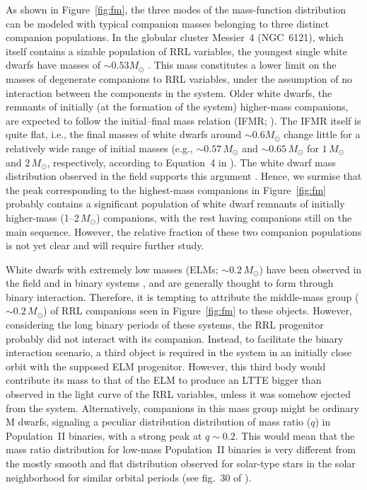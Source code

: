\documentclass[twocolumn,times]{aastex63}
\begin{document}
As shown in Figure~\ref{fig:fm}, the three modes of the mass-function distribution can be modeled with typical companion masses belonging
to three distinct companion populations.
In the globular cluster Messier~4 (NGC~6121), which itself contains a sizable population of RRL variables, the youngest single white dwarfs have masses of
$\sim0.53M_\odot$ \citep{2009ApJ...705..408K}. This mass constitutes a lower limit on the masses of degenerate companions to RRL variables,
under the assumption of no interaction between the components in the system. Older white dwarfs, the remnants of initially
(at the formation of the system) higher-mass companions, are expected to follow the initial--final mass relation (IFMR; \citealt{2018ApJ...866...21C}).
The IFMR itself is quite flat, i.e., the final masses of white dwarfs around $\sim0.6M_\odot$ change little for a relatively wide range
of initial masses (e.g., $\sim0.57\,M_\odot$ and $\sim0.65\,M_\odot$ for $1\,M_\odot$ and $2\,M_\odot$, respectively,
according to Equation~4 in \citealt{2018ApJ...866...21C}). The white dwarf mass distribution observed in the field supports this argument
\citep{2007MNRAS.375.1315K}.
Hence, we surmise that the peak corresponding to the highest-mass companions in Figure~\ref{fig:fm}
probably contains a significant population of white dwarf remnants of initially higher-mass (1--2$\,M_\odot$) companions,
with the rest having companions still on the main sequence. However, the relative fraction of these two companion populations
is not yet clear and will require further study.

White dwarfs with extremely low masses (ELMs; $\sim0.2\,M_\odot$) have been observed in the field \citep{2004ApJ...606L.147L}
and in binary systems \citep{2019ApJ...881L...3M}, and are generally thought to form through binary interaction. Therefore, it is tempting
to attribute the middle-mass group ($\sim0.2\,M_\odot$) of RRL companions seen in Figure~\ref{fig:fm} to these objects.
However, considering the long binary periods of these systems, the RRL progenitor probably did not interact with its companion. Instead, 
to facilitate the binary interaction scenario, a third object is required in the system in an initially close orbit with the supposed ELM progenitor.
However, this third body would contribute its mass to that of the ELM to produce an LTTE bigger than observed in the light curve of the RRL variables,
unless it was somehow ejected from the system. Alternatively, companions in this mass group might be ordinary M dwarfs, signaling a
peculiar distribution distribution of mass ratio ($q$) in Population~II binaries, with a strong peak at $q\sim0.2$.
This would mean that the mass ratio distribution for low-mass Population~II binaries is very different from the mostly smooth and
flat distribution observed for solar-type stars in the solar neighborhood for similar orbital periods (see fig.~30 of \citealt{2017ApJS..230...15M}).
\end{document}
